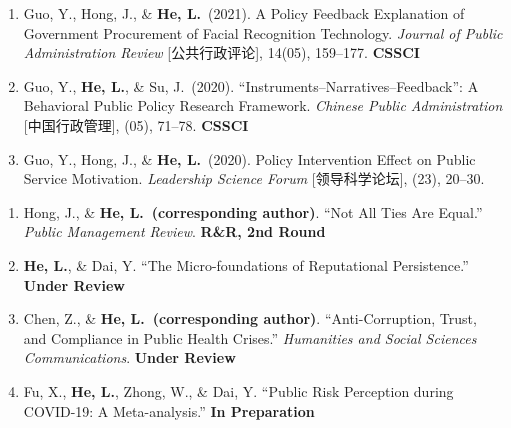 \documentclass[10pt, a4paper]{altacv}
\begin{document}
\begin{enumerate}
  \item Guo, Y., Hong, J., \& \textbf{He, L.}\ (2021).
    A Policy Feedback Explanation of Government Procurement of Facial Recognition Technology.
    \textit{Journal of Public Administration Review} [公共行政评论], 14(05), 159--177.
    \hfill {\color{soft}\textbf{CSSCI}}

  \item Guo, Y., \textbf{He, L.}, \& Su, J.\ (2020).
    ``Instruments--Narratives--Feedback'': A Behavioral Public Policy Research Framework.
    \textit{Chinese Public Administration} [中国行政管理], (05), 71--78.
    \hfill {\color{soft}\textbf{CSSCI}}

  \item Guo, Y., Hong, J., \& \textbf{He, L.}\ (2020).
    Policy Intervention Effect on Public Service Motivation.
    \textit{Leadership Science Forum} [领导科学论坛], (23), 20--30.
\end{enumerate}



\begin{enumerate}
  \item Hong, J., \& \textbf{He, L.\ (corresponding author)}.
    ``Not All Ties Are Equal.'' \textit{Public Management Review}.
    \hfill {\color{soft}\textbf{R\&R, 2nd Round}}

  \item \textbf{He, L.}, \& Dai, Y.
    ``The Micro-foundations of Reputational Persistence.''
    \hfill {\color{soft}\textbf{Under Review}}

  \item Chen, Z., \& \textbf{He, L.\ (corresponding author)}.
    ``Anti-Corruption, Trust, and Compliance in Public Health Crises.''
    \textit{Humanities and Social Sciences Communications}.
    \hfill {\color{soft}\textbf{Under Review}}

  \item Fu, X., \textbf{He, L.}, Zhong, W., \& Dai, Y.
    ``Public Risk Perception during COVID-19: A Meta-analysis.''
    \hfill {\color{soft}\textbf{In Preparation}}
\end{enumerate}


\end{document}
